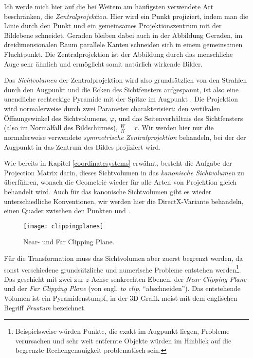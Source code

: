 Ich werde mich hier auf die bei Weitem am häufigsten verwendete Art beschränken, die \emph{Zentralprojektion}. Hier wird ein Punkt projiziert, indem man die Linie durch den Punkt und ein gemeinsames Projektionszentrum mit der Bildebene schneidet. Geraden bleiben dabei auch in der Abbildung Geraden, im dreidimensionalen Raum parallele Kanten schneiden sich in einem gemeinsamen Fluchtpunkt. Die Zentralprojektion ist der Abbildung durch das menschliche Auge sehr ähnlich und ermöglicht somit natürlich wirkende Bilder. 


Das \emph{Sichtvolumen} der Zentralprojektion wird also grundsätzlich von den Strahlen durch den Augpunkt und die Ecken des Sichtfensters aufgespannt, ist also eine unendliche rechteckige Pyramide mit der Spitze im Augpunkt . Die Projektion wird normalerweise durch zwei Parameter charakterisiert: den vertikalen Öffnungswinkel des Sichtvolumens, $\varphi$, und das Seitenverhältnis des Sichtfensters (also im Normalfall des Bildschirmes), $\frac{W}{H} = r$. Wir werden hier nur die normalerweise verwendete \emph{symmetrische Zentralprojektion} behandeln, bei der der Augpunkt in das Zentrum des Bildes projiziert wird.

Wie bereits in Kapitel \ref{coordinatesystems} erwähnt, besteht die Aufgabe der Projection Matrix darin, dieses Sichtvolumen in das \emph{kanonische Sichtvolumen} zu überführen, wonach die Geometrie wieder für alle Arten von Projektion gleich behandelt wird. Auch für das kanonische Sichtvolumen gibt es wieder unterschiedliche Konventionen, wir werden hier die DirectX-Variante behandeln, einen Quader zwischen den Punkten  und . 

\begin{wrapfigure}{r}{0.5\textwidth}
  \texttt{[image: clippingplanes]}
  \caption{Near- und Far Clipping Plane.}
  \label{clippingplanes}
\end{wrapfigure}

Für die Transformation muss das Sichtvolumen aber zuerst begrenzt werden, da sonst verschiedene grundsätzliche und numerische Probleme entstehen werden\footnote{Beispielsweise würden Punkte, die exakt im Augpunkt liegen, Probleme verursachen und sehr weit entfernte Objekte würden im Hinblick auf die begrenzte Rechengenauigkeit problematisch sein.}. Das geschieht mit zwei zur $z$-Achse senkrechten Ebenen, der \emph{Near Clipping Plane} und der \emph{Far Clipping Plane} (von engl. \emph{to clip}, \enquote{abschneiden}). Das entstehende Volumen ist ein Pyramidenstumpf, in der 3D-Grafik meist mit dem englischen Begriff \emph{Frustum} bezeichnet.

